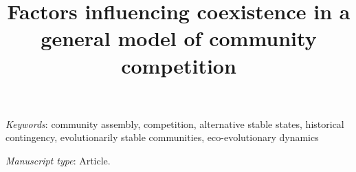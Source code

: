\documentclass[11pt]{article}
\title{Factors influencing coexistence in a general model of community competition}
\author{}
\date{}
\begin{document}
\maketitle

\raggedright
\setlength{\parskip}{1em}



%

\bigskip


\bigskip


\textit{Keywords}: {
community assembly,
competition,
alternative stable states,
historical contingency,
evolutionarily stable communities,
eco-evolutionary dynamics}


\bigskip

\textit{Manuscript type}: Article.

\bigskip


\linenumbers{}
\modulolinenumbers[3]



\clearpage













\end{document}
